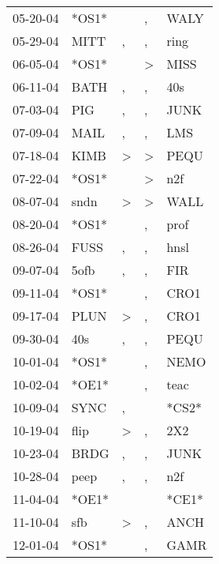 \begin{supertabular}{lllll}
 05-20-04 &  *OS1* &                  &                , &   WALY \\
 05-29-04 &   MITT &                , &                , &   ring \\
 06-05-04 &  *OS1* &                  &     \textgreater &   MISS \\
 06-11-04 &   BATH &                , &                , &    40s \\
 07-03-04 &    PIG &                , &                , &   JUNK \\
 07-09-04 &   MAIL &                , &                , &    LMS \\
 07-18-04 &   KIMB &     \textgreater &     \textgreater &   PEQU \\
 07-22-04 &  *OS1* &                  &     \textgreater &    n2f \\
 08-07-04 &   sndn &     \textgreater &     \textgreater &   WALL \\
 08-20-04 &  *OS1* &                  &                , &   prof \\
 08-26-04 &   FUSS &                , &                , &   hnsl \\
 09-07-04 &   5ofb &                , &                , &    FIR \\
 09-11-04 &  *OS1* &                  &                , &   CRO1 \\
 09-17-04 &   PLUN &     \textgreater &                , &   CRO1 \\
 09-30-04 &    40s &                , &                , &   PEQU \\
 10-01-04 &  *OS1* &                  &                , &   NEMO \\
 10-02-04 &  *OE1* &                  &                , &   teac \\
 10-09-04 &   SYNC &                , &                  &  *CS2* \\
 10-19-04 &   flip &     \textgreater &                , &    2X2 \\
 10-23-04 &   BRDG &                , &                , &   JUNK \\
 10-28-04 &   peep &                , &                , &    n2f \\
 11-04-04 &  *OE1* &                  &                  &  *CE1* \\
 11-10-04 &    sfb &     \textgreater &                , &   ANCH \\
 12-01-04 &  *OS1* &                  &                , &   GAMR \\

\end{supertabular}
